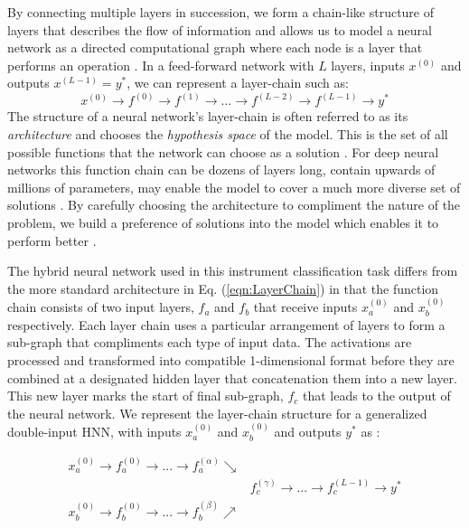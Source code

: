 \documentclass[conference,onecolumn,letterpaper]{IEEEtran}
\begin{document}
By connecting multiple layers in succession, we form a chain-like structure of layers that describes the flow of information and allows us to model a neural network as a directed computational graph where each node is a layer that performs an operation  \cite{Geron,Goodfellow}. In a feed-forward network with $L$ layers, inputs $x^{(0)}$ and outputs $x^{(L-1)} = y^*$, we can represent a layer-chain such as:
\begin{equation}
    \label{eqn:LayerChain}
    x^{(0)} \rightarrow f^{(0)} \rightarrow f^{(1)} \rightarrow ... \rightarrow f^{(L-2)} \rightarrow f^{(L-1)} \rightarrow y^*
\end{equation}
The structure of a neural network's layer-chain is often referred to as its \textit{architecture} and chooses the \textit{hypothesis space} of the model. This is the set of all possible functions that the network can choose as a solution \cite{Goodfellow,James}. For deep neural networks this function chain can be dozens of layers long, contain upwards of millions of parameters, may enable the model to cover a much more diverse set of solutions \cite{Geron}. By carefully choosing the architecture to compliment the nature of the problem, we build a preference of solutions into the model which enables it to perform better \cite{Goodfellow}.

The hybrid neural network used in this instrument classification task differs from the more standard architecture in Eq. (\ref{eqn:LayerChain}) in that the function chain consists of two input layers, $f_a$ and $f_b$ that receive inputs $x^{(0)}_a$ and $x^{(0)}_b$ respectively. Each layer chain uses a particular arrangement of layers to form a sub-graph that compliments each type of input data. The activations are processed and transformed into compatible 1-dimensional format before they are combined at a designated hidden layer that concatenation them into a new layer. This new layer marks the start of final sub-graph, $f_c$ that leads to the output of the neural network. We represent the layer-chain structure for a generalized double-input HNN, with inputs $x^{(0)}_a$ and $x^{(0)}_b$ and outputs $y^*$ as :

\begin{equation}
    \label{eqn:LayerGraph}
    \begin{split}
        x^{(0)}_a \rightarrow f^{(0)}_a \rightarrow  ... \rightarrow f^{(\alpha)}_a \searrow &\\
                & f^{(\gamma)}_c \rightarrow ... \rightarrow f^{(L-1)}_c \rightarrow y^* \\
        x^{(0)}_b \rightarrow f^{(0)}_b \rightarrow  ... \rightarrow f^{(\beta)}_b \nearrow &\\
    \end{split}
\end{equation}
\end{document}
